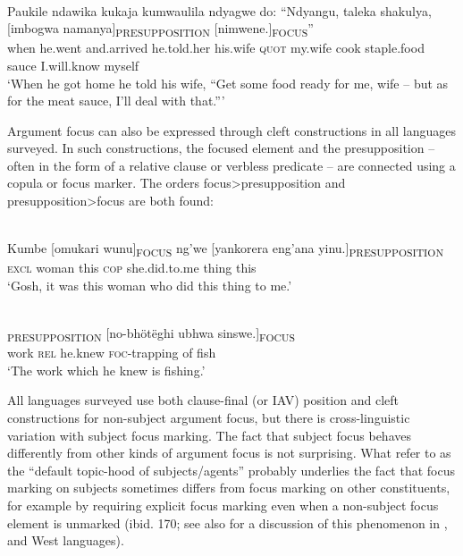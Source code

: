 \documentclass[output=paper]{langsci/langscibook}
\begin{document}
\ea\label{ex:17.nicolle}
\\
\gll Paukile ndawika kukaja kumwaulila ndyagwe do: “Ndyangu, taleka shakulya, [imbogwa namanya]\textsubscript{PRESUPPOSITION} [nimwene.]\textsubscript{FOCUS}”\\
when he.went and.arrived he.told.her his.wife \textsc{quot} my.wife cook staple.food {\db}sauce I.will.know {\db}myself \\
\glt ‘When he got home he told his wife, “Get some food ready for me, wife -- but as for the meat sauce, I’ll deal with that.”’
\z

Argument focus can also be expressed through cleft constructions in all languages surveyed. In such constructions, the focused element and the presupposition -- often in the form of a relative clause or verbless predicate -- are connected using a copula or focus marker. The orders focus>presupposition and presupposition>focus are both found:

\ea\label{ex:18.nicolle}
\\
\gll Kumbe [omukari wunu]\textsubscript{FOCUS} ng’we [yankorera eng’ana yinu.]\textsubscript{PRESUPPOSITION}\\
\textsc{excl} {\db}woman this \textsc{cop} {\db}she.did.to.me thing this \\
\glt ‘Gosh, it was this woman who did this thing to me.’
\z

\ea\label{ex:19.nicolle}
\\
\textsubscript{PRESUPPOSITION} [no-bhötëghi \!ubhwa sinswe.]\textsubscript{FOCUS}\\
{\db}work \textsc{rel} he.knew {\db}\textsc{foc}-trapping of fish\\
\glt ‘The work which he knew is fishing.’
\z

All languages surveyed use both clause-final (or IAV) position and cleft constructions for non-subject argument focus, but there is cross-linguistic variation with subject focus marking. The fact that subject focus behaves differently from other kinds of argument focus is not surprising. What \citet[159]{gueldemannetal2015} refer to as the “default topic-hood of subjects/agents” probably underlies the fact that focus marking on subjects sometimes differs from focus marking on other constituents, for example by requiring explicit focus marking even when a non-subject focus element is unmarked (ibid. 170; see also \citealt{fiedleretal2010} for a discussion of this phenomenon in ,  and West  languages).
\end{document}
